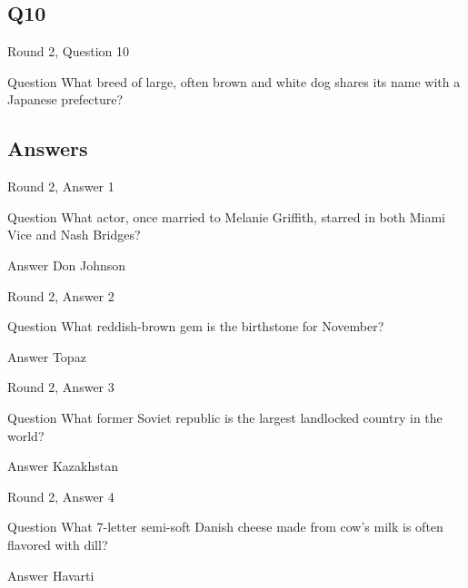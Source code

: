 \documentclass[11pt]{beamer}
\begin{document}
\subsection*{Q10}
\begin{frame}[t]{Round 2, Question 10}
\vspace{2em}
\begin{block}{Question}
What breed of large, often brown and white dog shares its name with a Japanese prefecture\@?
\end{block}
\end{frame}
    
\subsection{Answers}

\begin{frame}[t]{Round 2, Answer 1}
\vspace{2em}
\begin{block}{Question}
What actor, once married to Melanie Griffith, starred in both Miami Vice and Nash Bridges\@?
\end{block}
\pause{}
\begin{block}{Answer}
Don Johnson
\end{block}
\end{frame}
    

\begin{frame}[t]{Round 2, Answer 2}
\vspace{2em}
\begin{block}{Question}
What reddish-brown gem is the birthstone for November\@?
\end{block}
\pause{}
\begin{block}{Answer}
Topaz
\end{block}
\end{frame}
    

\begin{frame}[t]{Round 2, Answer 3}
\vspace{2em}
\begin{block}{Question}
What former Soviet republic is the largest landlocked country in the world\@?
\end{block}
\pause{}
\begin{block}{Answer}
Kazakhstan
\end{block}
\end{frame}
    

\begin{frame}[t]{Round 2, Answer 4}
\vspace{2em}
\begin{block}{Question}
What 7-letter semi-soft Danish cheese made from cow's milk is often flavored with dill\@?
\end{block}
\pause{}
\begin{block}{Answer}
Havarti
\end{block}
\end{frame}
    
\end{document}
